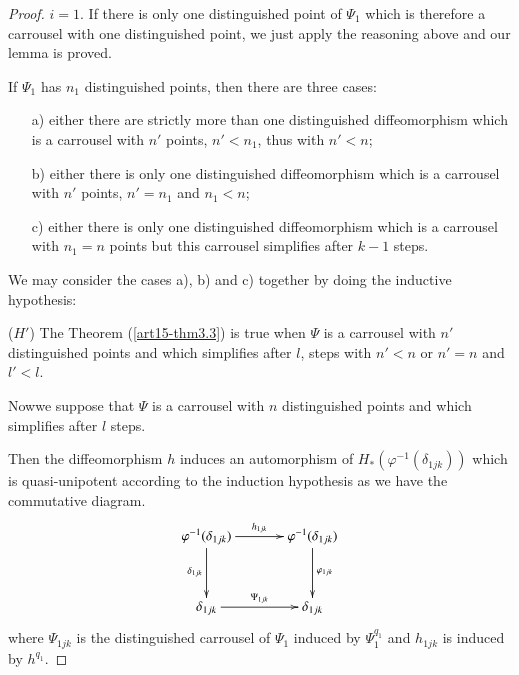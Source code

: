 \begin{proof}
$i=1$. If there is only one distinguished point of $\Psi_1$ which is therefore a carrousel with one distinguished point, we just apply the reasoning above and our lemma is proved.


If $\Psi_1$ has $n_1$ distinguished points, then there are three cases:
\begin{itemize}
\item[a)] either there are strictly more than one distinguished diffeomorphism which is a carrousel with $n'$ points, $n'< n_1$, thus with $n'< n$;

\item[b)] either there is only one distinguished diffeomorphism which is a carrousel with $n'$ points, $n' = n_1$ and $n_1 < n$;

\item[c)] either there is only one distinguished diffeomorphism which is a carrousel with $n_1 =n$ points but this carrousel simplifies after $k-1$ steps.
\end{itemize}

We may consider the cases a), b) and c) together by doing the inductive hypothesis:

($H'$) The Theorem (\ref{art15-thm3.3}) is true when $\Psi$ is a carrousel with $n'$ distinguished points and which simplifies after $l$, steps with $n'<n$ or $n' = n$ and $l' < l$.

Now\pageoriginale we suppose that $\Psi$ is a carrousel with $n$ distinguished points and which simplifies after $l$ steps.

Then the diffeomorphism $h$ induces an automorphism of $H_* (\varphi^{-1} (\delta_{1jk}))$ which is quasi-unipotent according to the induction hypothesis as we have the commutative diagram.
\[
\xymatrix@R=1.2cm@C=1.2cm{
\varphi^{-1} (\delta_{1jk}) \ar[r]^{h_{1jk}} \ar[d]_{\delta_{1jk}} & \varphi^{-1} (\delta_{1jk}) \ar[d]^{\varphi_{1jk}}\\
\delta_{1jk} \ar[r]^{\Psi_{1jk}} & \delta_{1jk}
}
\]
where $\Psi_{1jk}$ is the distinguished carrousel of $\Psi_1$ induced by $\Psi^{q_1}_1$ and $h_{1jk}$ is induced by $h^{q_1}$.

\vskip 0.2cm


\end{proof}
